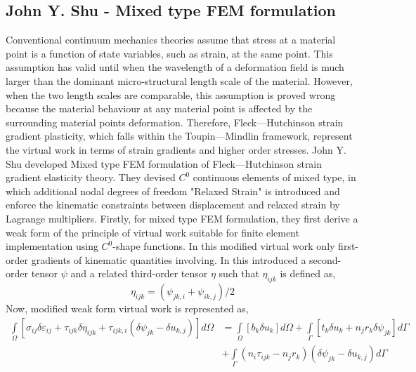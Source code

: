 \documentclass[12pt]{article}
\begin{document}
\subsection{John Y. Shu - Mixed type FEM formulation}
\vspace{0.4cm}
Conventional continuum mechanics theories assume that stress at a material point is a function
of state variables, such as strain, at the same point. This assumption has valid until when the wavelength of a deformation field is much larger than the dominant micro-structural length scale of the material. However, when the two length scales are comparable, this assumption is proved wrong because the material behaviour at any material point is affected by the surrounding material points deformation. Therefore, Fleck—Hutchinson strain gradient plasticity, which falls within the Toupin—Mindlin framework, represent the virtual work in terms of strain gradients and higher order stresses.
\newline
\newline
John Y. Shu developed Mixed type FEM formulation of Fleck—Hutchinson strain gradient elasticity theory. They devised $C^0$ continuous elements of mixed type, in which additional nodal degrees of freedom "Relaxed Strain" is introduced and enforce the kinematic constraints between displacement and relaxed strain by Lagrange multipliers.
\newline
\newline
Firstly, for mixed type FEM formulation, they first derive a weak form of the principle of virtual
work suitable for finite element implementation using $C^0$-shape functions. In this modified virtual work only first-order gradients of kinematic quantities involving. In this introduced a second-order tensor $\psi$ and a related third-order tensor $\eta$ such that $\eta_{ijk}$ is defined as,
\\
\begin{equation}\label{twotwo} 
\eta_{ijk} = (\psi_{jk,i}+\psi_{ik,j})/2
\end{equation}
Now, modified weak form virtual work is represented as,
\begin{equation}\label{twothree}
\begin{aligned}
\int\limits_\Omega\! [ \sigma_{ij}\delta\varepsilon_{ij} + \tau_{ijk}\delta\eta_{ijk} + \tau_{ijk,i}(\delta\psi_{jk}-\delta u_{k,j})  ] d\Omega &= \int\limits_\Omega\! [b_k\delta u_k] d\Omega + \int\limits_\Gamma\! [ t_k\delta u_k + n_jr_k\delta\psi_{jk} ] d\Gamma \\
&+ \int\limits_\Gamma\! ( n_i\tau_{ijk} -n_jr_k ) ( \delta\psi_{jk}-\delta u_{k,j} ) d\Gamma
\end{aligned}
\end{equation}
\end{document}
